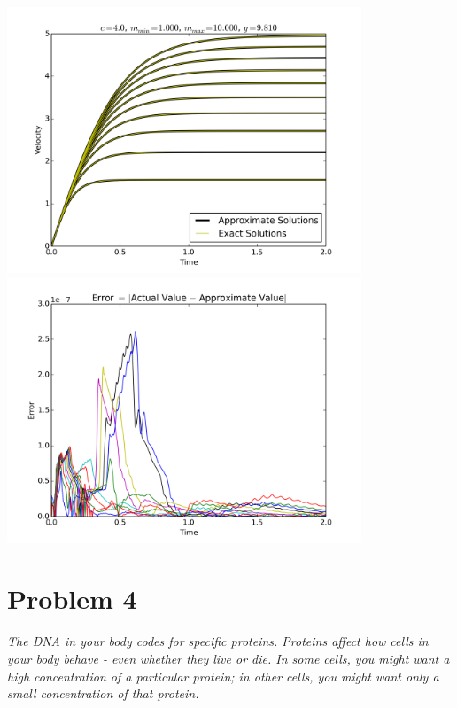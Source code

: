 \documentclass[12pt]{article}
\begin{document}
\begin{center}
	\includegraphics[width=400px]{figures/3_d_1.png}
	\includegraphics[width=400px]{figures/3_d_2.png}
\end{center}

\section*{Problem 4}
{\it The DNA in your body codes for specific proteins.  Proteins affect how cells in your body behave - even whether they live or die.  In some cells, you might want a high concentration of a particular protein; in other cells, you might want only a small concentration of that protein.}\\
\end{document}
